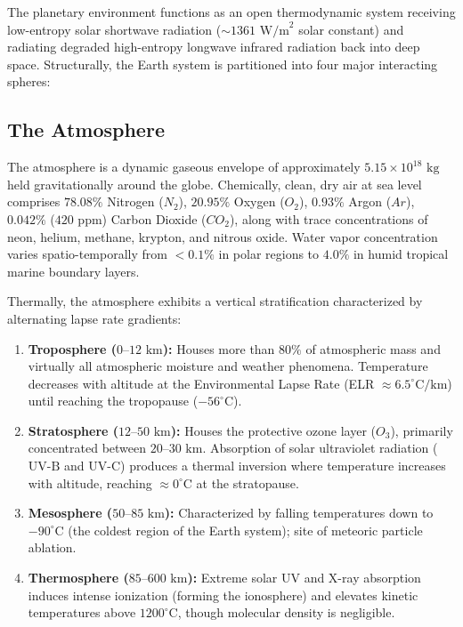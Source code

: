 The planetary environment functions as an open thermodynamic system receiving low-entropy solar shortwave radiation ($\sim 1361\text{ W/m}^2$ solar constant) and radiating degraded high-entropy longwave infrared radiation back into deep space. Structurally, the Earth system is partitioned into four major interacting spheres:

\subsection{The Atmosphere}
The atmosphere is a dynamic gaseous envelope of approximately $5.15 \times 10^{18}\text{ kg}$ held gravitationally around the globe. Chemically, clean, dry air at sea level comprises $78.08\%$ Nitrogen ($N_2$), $20.95\%$ Oxygen ($O_2$), $0.93\%$ Argon ($Ar$), $0.042\%$ ($420\text{ ppm}$) Carbon Dioxide ($CO_2$), along with trace concentrations of neon, helium, methane, krypton, and nitrous oxide. Water vapor concentration varies spatio-temporally from $<0.1\%$ in polar regions to $4.0\%$ in humid tropical marine boundary layers.

Thermally, the atmosphere exhibits a vertical stratification characterized by alternating lapse rate gradients:
\begin{enumerate}[leftmargin=1.5em]
    \item \textbf{Troposphere ($0\text{--}12\text{ km}$):} Houses more than $80\%$ of atmospheric mass and virtually all atmospheric moisture and weather phenomena. Temperature decreases with altitude at the Environmental Lapse Rate (ELR $\approx 6.5^\circ\text{C/km}$) until reaching the tropopause ($-56^\circ\text{C}$).
    \item \textbf{Stratosphere ($12\text{--}50\text{ km}$):} Houses the protective ozone layer ($O_3$), primarily concentrated between $20\text{--}30\text{ km}$. Absorption of solar ultraviolet radiation ($\text{UV-B}$ and $\text{UV-C}$) produces a thermal inversion where temperature increases with altitude, reaching $\approx 0^\circ\text{C}$ at the stratopause.
    \item \textbf{Mesosphere ($50\text{--}85\text{ km}$):} Characterized by falling temperatures down to $-90^\circ\text{C}$ (the coldest region of the Earth system); site of meteoric particle ablation.
    \item \textbf{Thermosphere ($85\text{--}600\text{ km}$):} Extreme solar UV and X-ray absorption induces intense ionization (forming the ionosphere) and elevates kinetic temperatures above $1200^\circ\text{C}$, though molecular density is negligible.
\end{enumerate}

